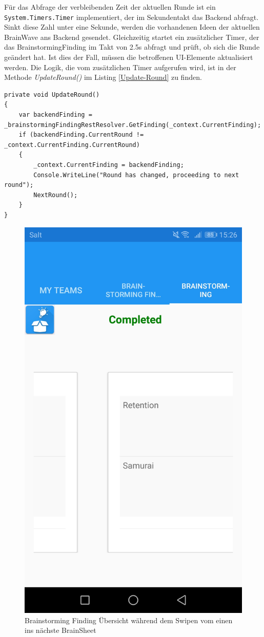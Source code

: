 Für das Abfrage der verbleibenden Zeit der aktuellen Runde ist ein \texttt{System.{\-}Timers.Timer} implementiert, der im Sekundentakt das Backend abfragt. Sinkt diese Zahl unter eine Sekunde, werden die vorhandenen Ideen der aktuellen BrainWave ans Backend gesendet. Gleichzeitig startet ein zusätzlicher Timer, der das BrainstormingFinding im Takt von 2.5s abfragt und prüft, ob sich die Runde geändert hat. Ist dies der Fall, müssen die betroffenen UI-Elemente aktualisiert werden. Die Logik, die vom zusätzlichen Timer aufgerufen wird, ist in der Methode \textit{UpdateRound()} im Listing \ref{Update-Round} zu finden.

\begin{lstlisting}[label=Update-Round,caption=Poll-Mechanismus um zu prüfen ob Runde gewechselt hat]
private void UpdateRound()
{
	var backendFinding = _brainstormingFindingRestResolver.GetFinding(_context.CurrentFinding);
	if (backendFinding.CurrentRound != _context.CurrentFinding.CurrentRound)
	{
		_context.CurrentFinding = backendFinding;
		Console.WriteLine("Round has changed, proceeding to next round");
		NextRound();
	}
}
\end{lstlisting}



\begin{figure}[h]
	\centering
	\includegraphics[width=0.4\linewidth]{img/techn-bericht/brainstorming-overview}
	\caption{Brainstorming Finding Übersicht während dem Swipen vom einen ins nächste BrainSheet}
	\label{fig:brainstorming-overview}
\end{figure}


